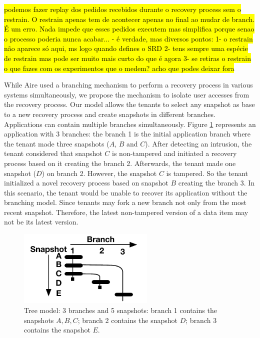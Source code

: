 \hl{podemos fazer replay dos pedidos recebidos durante o recovery process sem o restrain. O restrain apenas tem de acontecer apenas no final ao mudar de branch. É um erro. Nada impede que esses pedidos executem mas simplifica porque senao o processo poderia nunca acabar... - é verdade, mas diversos pontos:
1- o restrain não aparece só aqui, ms logo quando defines o SRD
2- tens sempre uma espécie de restrain mas pode ser muito mais curto do que é agora
3- se retiras o restrain o que fazes com os experimentos que o medem? acho que podes deixar fora
}


While Aire \cite{retro} used a branching mechanism to perform a recovery process in various systems simultaneously, we propose the mechanism to isolate user accesses from the recovery process. Our model allows the tenants to select any snapshot as base to a new recovery process and create snapshots in different branches. Applications can contain multiple branches simultaneously. Figure \ref{fig:branches} represents an application with 3 branches: the branch 1 is the initial application branch where the tenant made three snapshots ($A$, $B$ and $C$). After detecting an intrusion, the tenant considered that snapshot $C$ is non-tampered and initiated a recovery process based on it creating the branch 2. Afterwards, the tenant made one snapshot ($D$) on branch 2. However, the snapshot $C$ is tampered. So the tenant initialized a novel recovery process based on snapshot $B$ creating the branch 3. In this scenario, the tenant would be unable to recover its application without the branching model. Since tenants may fork a new branch not only from the most recent snapshot. Therefore, the latest non-tampered version of a data item may not be its latest version.

\begin{figure}
\centering
\includegraphics[width=65mm]{images/branches}
\caption[Tree model]{Tree model: 3 branches and 5 snapshots: branch 1 contains the snapshots $A, B, C$; branch 2 contains the snapshot $D$;  branch 3 contains the snapshot $E$.}
\label{fig:branches}
\end{figure}



